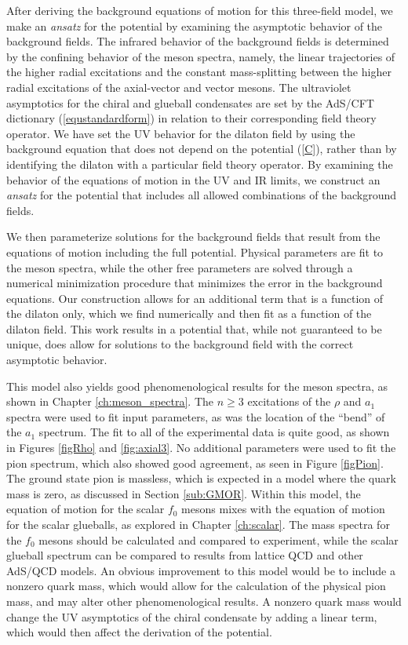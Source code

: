 After deriving the background equations of motion for this three-field model, we make an \emph{ansatz} for the potential by examining the asymptotic behavior of the background fields.
The infrared behavior of the background fields is determined by the confining behavior of the meson spectra, namely, the linear trajectories of the higher radial excitations and the constant mass-splitting between the higher radial excitations of the axial-vector and vector mesons.
The ultraviolet asymptotics for the chiral and glueball condensates are set by the AdS/CFT dictionary (\ref{equstandardform}) in relation to their corresponding field theory operator.
We have set the UV behavior for the dilaton field by using the background equation that does not depend on the potential (\ref{C}), rather than by identifying the dilaton with a particular field theory operator. 
By examining the behavior of the equations of motion in the UV and IR limits, we construct an \emph{ansatz} for the potential that includes all allowed combinations of the background fields.

We then parameterize solutions for the background fields that result from the equations of motion including the full potential.
Physical parameters are fit to the meson spectra, while the other free parameters are solved through a numerical minimization procedure that minimizes the error in the background equations.
Our construction allows for an additional term that is a function of the dilaton only, which we find numerically and then fit as a function of the dilaton field.
This work results in a potential that, while not guaranteed to be unique, does allow for solutions to the background field with the correct asymptotic behavior.

This model also yields good phenomenological results for the meson spectra, as shown in Chapter \ref{ch:meson_spectra}.
The $n\ge3$ excitations of the $\rho$ and $a_1$ spectra were used to fit input parameters, as was the location of the ``bend'' of the $a_1$ spectrum.
The fit to all of the experimental data is quite good, as shown in Figures \ref{figRho} and \ref{fig:axial3}.
No additional parameters were used to fit the pion spectrum, which also showed good agreement, as seen in Figure \ref{figPion}.
The ground state pion is massless, which is expected in a model where the quark mass is zero, as discussed in Section \ref{sub:GMOR}.
Within this model, the equation of motion for the scalar $f_0$ mesons mixes with the equation of motion for the scalar glueballs, as explored in Chapter \ref{ch:scalar}.
The mass spectra for the $f_0$ mesons should be calculated and compared to experiment, while the scalar glueball spectrum can be compared to results from lattice QCD and other AdS/QCD models.
An obvious improvement to this model would be to include a nonzero quark mass, which would allow for the calculation of the physical pion mass, and may alter other phenomenological results.
A nonzero quark mass would change the UV asymptotics of the chiral condensate by adding a linear term, which would then affect the derivation of the potential.


